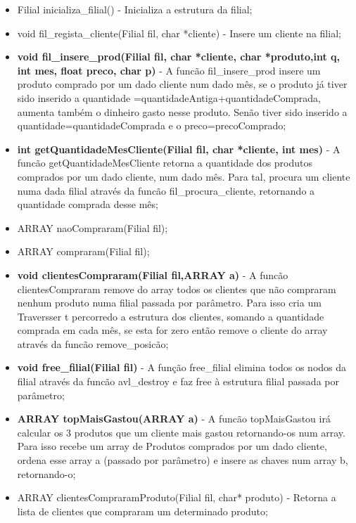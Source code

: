 \begin{itemize}
\item	Filial inicializa\_filial() - Inicializa a estrutura da filial; 

\item	void fil\_regista\_cliente(Filial fil, char *cliente) - Insere um cliente na filial; 

\item 	\textbf{void fil\_insere\_prod(Filial fil, char *cliente, char *produto,int q, int mes, float preco, char p)} - A funcão fil\_insere\_prod insere  um produto comprado por um dado cliente num dado mês, se o produto já tiver sido inserido a quantidade =quantidadeAntiga+quantidadeComprada, aumenta também o dinheiro gasto nesse produto. Senão tiver sido inserido a quantidade=quantidadeComprada e o 
preco=precoComprado; 
 
\item	\textbf{int getQuantidadeMesCliente(Filial fil, char *cliente, int mes)} - A funcão getQuantidadeMesCliente retorna a quantidade dos produtos comprados por um dado cliente, num dado mês. Para tal, procura um cliente numa dada filial através da funcão fil\_procura\_cliente, retornando a quantidade comprada  desse mês; 

\item	ARRAY naoCompraram(Filial fil);
\item	ARRAY compraram(Filial fil);
\item	\textbf{void clientesCompraram(Filial fil,ARRAY a)} - A funcão clientesCompraram remove do array todos os clientes que não compraram nenhum produto numa filial passada por parâmetro. Para isso cria um Traversser t percorredo a estrutura dos clientes, somando a quantidade comprada em cada mês, se esta for zero então remove o cliente do array através da funcão remove\_posicão; 
\item	\textbf{void free\_filial(Filial fil)} - A função free\_filial elimina todos os nodos da filial através da funcão avl\_destroy e faz  free à estrutura filial passada por parâmetro; 
\item	\textbf{ARRAY topMaisGastou(ARRAY a)} - A funcão topMaisGastou irá calcular os 3 produtos que um cliente mais gastou retornando-os num array. Para isso recebe um array de Produtos comprados por um dado cliente, ordena esse array a (passado por parâmetro) e insere as chaves num array b, retornando-o; 
\item	ARRAY clientesCompraramProduto(Filial fil, char* produto) - Retorna a lista de clientes que compraram um determinado produto; 


\end{itemize}
